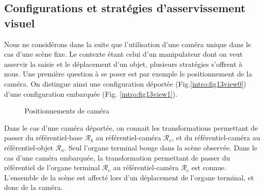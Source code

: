 \subsection{Configurations et stratégies d'asservissement visuel}

Nous ne considérons dans la suite que l'utilisation d'une caméra unique dans le cas d'une scène fixe. Le contexte étant celui d'un manipulateur dont on veut asservir la saisie et le déplacement d'un objet, plusieurs stratégies s'offrent à nous. Une première question à se poser est par exemple le positionnement de la caméra. On distingue ainsi une configuration déportée (Fig.\ref{intro:fig13view0}) d'une configuration embarquée (Fig. \ref{intro:fig13view1}).

\begin{figure}[htp]
  \centering
   \hfill
    \caption{\footnotesize{Positionnements de caméra}}
\label{intro:fig13}
\end{figure}

Dans le cas d'une caméra déportée, on connait les transformations permettant de passer du référentiel-base $\mathcal R_b$ au référentiel-caméra $\mathcal R_c$, et du référentiel-caméra au référentiel-objet $\mathcal R_o$. Seul l'organe terminal bouge dans la scène observée. Dans le cas d'une caméra embarquée, la transformation permettant de passer du référentiel de l'organe terminal $\mathcal R_e$ au référentiel-caméra $\mathcal R_c$ est connue. L'ensemble de la scène est affecté lors d'un déplacement de l'organe terminal, et donc de la caméra.

